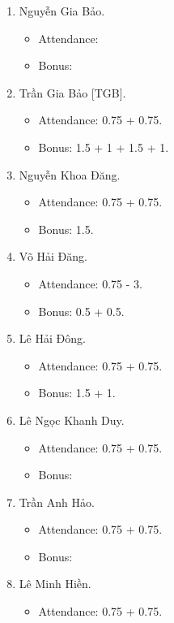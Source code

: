 \documentclass{article}
\begin{document}
\begin{enumerate}
    \item {\sc Nguyễn Gia Bảo.}
    \begin{itemize}
        \item Attendance:
        \item Bonus:
    \end{itemize}
    \item {\sc Trần Gia Bảo [TGB].}
    \begin{itemize}
        \item Attendance: 0.75 + 0.75.
        \item Bonus: 1.5 + 1 + 1.5 + 1.
    \end{itemize}
    \item {\sc Nguyễn Khoa Đăng.}
    \begin{itemize}
        \item Attendance: 0.75 + 0.75.
        \item Bonus: 1.5.
    \end{itemize}
    \item {\sc Võ Hải Đăng.}
    \begin{itemize}
        \item Attendance: 0.75 - 3.
        \item Bonus: 0.5 + 0.5.
    \end{itemize}
    \item {\sc Lê Hải Đông.}
    \begin{itemize}
        \item Attendance: 0.75 + 0.75.
        \item Bonus: 1.5 + 1.
    \end{itemize}
    \item {\sc Lê Ngọc Khanh Duy.}
    \begin{itemize}
        \item Attendance: 0.75 + 0.75.
        \item Bonus:
    \end{itemize}
    \item {\sc Trần Anh Hảo.}
    \begin{itemize}
        \item Attendance: 0.75 + 0.75.
        \item Bonus:
    \end{itemize}
    \item {\sc Lê Minh Hiền.}
    \begin{itemize}
        \item Attendance: 0.75 + 0.75.

\end{itemize}
\end{enumerate}
\end{document}
